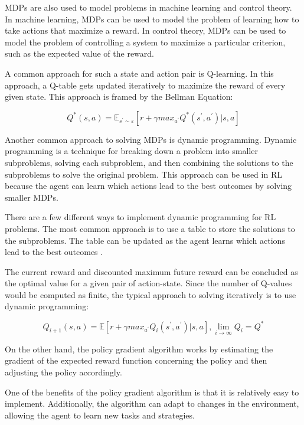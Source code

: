 \documentclass{article}
\begin{document}
MDPs are also used to model problems in machine learning and control theory. In machine learning, MDPs can be used to model the problem of learning how to take actions that maximize a reward. In control theory, MDPs can be used to model the problem of controlling a system to maximize a particular criterion, such as the expected value of the reward.

A common approach for such a state and action pair is Q-learning. In this approach, a Q-table gets updated iteratively to maximize the reward of every given state. This approach is framed by the Bellman Equation:

\begin{equation} \label{Bellman Equation}
  Q^{\ast}(s,a)=\mathbb{E}_{s^{'}\sim\varepsilon}[r+\gamma{max_{a^{'}}Q^{*}(s^{'},a^{'})}|s,a]
\end{equation}

Another common approach to solving MDPs is dynamic programming. Dynamic programming is a technique for breaking down a problem into smaller subproblems, solving each subproblem, and then combining the solutions to the subproblems to solve the original problem. This approach can be used in RL because the agent can learn which actions lead to the best outcomes by solving smaller MDPs.

There are a few different ways to implement dynamic programming for RL problems. The most common approach is to use a table to store the solutions to the subproblems. The table can be updated as the agent learns which actions lead to the best outcomes \citep{lewis2009reinforcement}.

The current reward and discounted maximum future reward can be concluded as the optimal value for a given pair of action-state. Since the number of Q-values would be computed as finite, the typical approach to solving iteratively is to use dynamic programming:

\begin{equation}
  Q_{i+1}(s,a)=\mathbb{E}[r+\gamma{max_{a^{'}}Q_{i}(s^{'},a^{'})}|s,a],{}\lim_{i\rightarrow{\infty}}Q_{i}=Q^{\ast}
\end{equation}

On the other hand, the policy gradient algorithm works by estimating the gradient of the expected reward function concerning the policy and then adjusting the policy accordingly. 

One of the benefits of the policy gradient algorithm is that it is relatively easy to implement. Additionally, the algorithm can adapt to changes in the environment, allowing the agent to learn new tasks and strategies.
\end{document}
